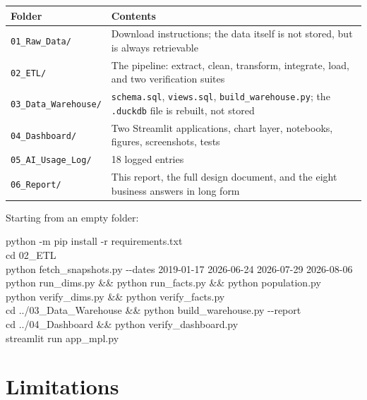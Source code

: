 \documentclass[11pt,a4paper]{article}
\newcommand{\sansall}{\sffamily}
\newcommand{\code}[1]{\texttt{#1}}
\begin{document}
\begin{table}[htbp]\centering\small
\begin{tabular}{L{4.4cm} L{10.6cm}}
\toprule
\sansall\bfseries Folder & \sansall\bfseries Contents \\
\midrule
\code{01\_Raw\_Data/} & Download instructions; the data itself is not stored, but
  is always retrievable \\
\code{02\_ETL/} & The pipeline: extract, clean, transform, integrate, load, and two
  verification suites \\
\code{03\_Data\_Warehouse/} & \code{schema.sql}, \code{views.sql},
  \code{build\_warehouse.py}; the \code{.duckdb} file is rebuilt, not stored \\
\code{04\_Dashboard/} & Two Streamlit applications, chart layer, notebooks,
  figures, screenshots, tests \\
\code{05\_AI\_Usage\_Log/} & 18 logged entries \\
\code{06\_Report/} & This report, the full design document, and the eight
  business answers in long form \\
\bottomrule
\end{tabular}
\end{table}

Starting from an empty folder:

\begin{tcolorbox}[colback=wash, colframe=rule, boxrule=0.4pt, arc=1pt,
                  left=8pt, right=8pt, top=5pt, bottom=5pt]
\small\ttfamily
python -m pip install -r requirements.txt\\[2pt]
cd 02\_ETL\\
python fetch\_snapshots.py -{}-dates 2019-01-17 2026-06-24 2026-07-29 2026-08-06\\
python run\_dims.py \&\& python run\_facts.py \&\& python population.py\\
python verify\_dims.py \&\& python verify\_facts.py\\[2pt]
cd ../03\_Data\_Warehouse \&\& python build\_warehouse.py -{}-report\\[2pt]
cd ../04\_Dashboard \&\& python verify\_dashboard.py\\
streamlit run app\_mpl.py
\end{tcolorbox}

\section{Limitations}
\end{document}
